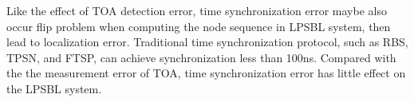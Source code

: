 Like the effect of TOA detection error, time synchronization error maybe also occur flip problem when computing the node sequence in LPSBL system, then lead to localization error.
Traditional time synchronization protocol, such as RBS, TPSN, and FTSP, can achieve synchronization less than 100ns. 
Compared with the the measurement error of TOA, time synchronization error has little effect on the LPSBL system.












